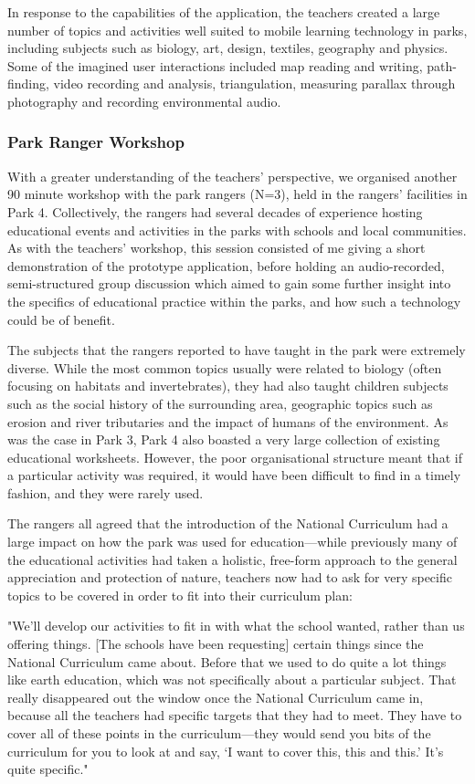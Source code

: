 In response to the capabilities of the application, the teachers created a large number of topics and activities well suited to mobile learning technology in parks, including subjects such as biology, art, design, textiles, geography and physics. Some of the imagined user interactions included map reading and writing, path-finding, video recording and analysis, triangulation, measuring parallax through photography and recording environmental audio.

\subsubsection{Park Ranger Workshop}

With a greater understanding of the teachers’ perspective, we organised another 90 minute workshop with the park rangers (N=3), held in the rangers' facilities in Park 4. Collectively, the rangers had several decades of experience hosting educational events and activities in the parks with schools and local communities. As with the teachers' workshop, this session consisted of me giving a short demonstration of the prototype application, before holding an audio-recorded, semi-structured group discussion which aimed to gain some further insight into the specifics of educational practice within the parks, and how such a technology could be of benefit. 

The subjects that the rangers reported to have taught in the park were extremely diverse. While the most common topics usually were related to biology (often focusing on habitats and invertebrates), they had also taught children subjects such as the social history of the surrounding area, geographic topics such as erosion and river tributaries and the impact of humans of the environment. As was the case in Park 3, Park 4 also boasted a very large collection of existing educational worksheets. However, the poor organisational structure meant that if a particular activity was required, it would have been difficult to find in a timely fashion, and they were rarely used.

The rangers all agreed that the introduction of the National Curriculum had a large impact on how the park was used for education---while previously many of the educational activities had taken a holistic, free-form approach to the general appreciation and protection of nature, teachers now had to ask for very specific topics to be covered in order to fit into their curriculum plan: 

\begin{displayquote}
"We'll develop our activities to fit in with what the school wanted, rather than us offering things. [The schools have been requesting] certain things since the National Curriculum came about. Before that we used to do quite a lot things like earth education, which was not specifically about a particular subject. That really disappeared out the window once the National Curriculum came in, because all the teachers had specific targets that they had to meet. They have to cover all of these points in the curriculum---they would send you bits of the curriculum for you to look at and say, `I want to cover this, this and this.' It's quite specific."
\end{displayquote}

